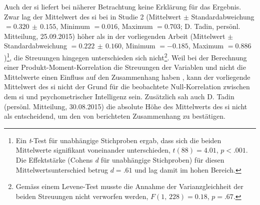 \documentclass[11pt, twoside, a4paper]{book}		%
\begin{document}
Auch der \gls{si} liefert bei näherer Betrachtung keine Erklärung für das Ergebnis. Zwar lag der Mittelwert des \gls{si} bei \citet{Melnick2013} in Studie 2 (Mittelwert $\pm$ Standardabweichung $=0.320\,\pm\,0.155$, Minimum $=0.016$, Maximum $=0.703$; D. Tadin, persönl. Mitteilung, 25.09.2015) höher als in der vorliegenden Arbeit (Mittelwert $\pm$ Standardabweichung $=0.222\,\pm\,0.160$, Minimum $= -0.185$, Maximum $= 0.886$)\footnote{Ein \textit{t}-Test für unabhängige Stichproben ergab, dass sich die beiden Mittelwerte signifikant voneinander unterschieden, $t(88)=4.01$, $p<.001$. Die Effektstärke (Cohens \textit{d} für unabhängige Stichproben) für diesen Mittelwertsunterschied betrug $d=.61$ und lag damit im hohen Bereich.}, die Streuungen hingegen unterschieden sich nicht\footnote{Gemäss einem Levene-Test musste die Annahme der Varianzgleichheit der beiden Streuungen nicht verworfen werden, $F(1,\,228)=0.18$, $p=.67$.}. 
Weil bei der Berechnung einer Produkt-Moment-Korrelation die Streuungen der Variablen und nicht die Mittelwerte einen Einfluss auf den Zusammenhang haben \citep[S. 506]{Eid2013}, kann der vorliegende Mittelwert des \gls{si} nicht der Grund für die beobachtete Null-Korrelation zwischen dem \gls{si} und psychometrischer Intelligenz sein. Zusätzlich sah auch D. Tadin (persönl. Mitteilung, 30.08.2015) die absolute Höhe des Mittelwerts des \gls{si} nicht als entscheidend, um den von \citeauthor{Melnick2013} berichteten Zusammenhang zu bestätigen.
\end{document}
